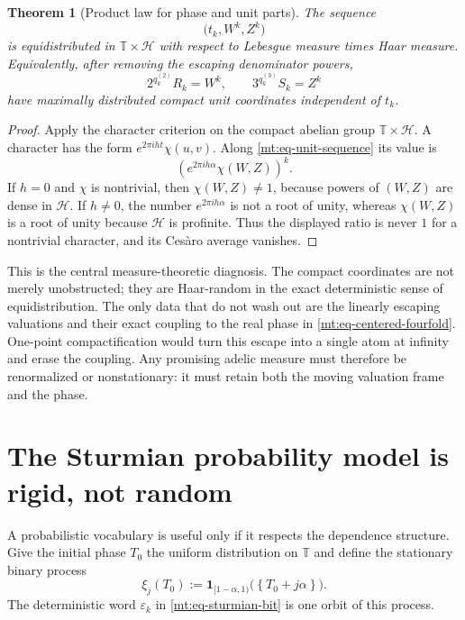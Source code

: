 \documentclass[11pt,oneside]{article}
\newtheorem{theorem}{Theorem}[section]
\theoremstyle{definition}
\theoremstyle{remark}
\newcommand{\Torus}{\mathbb T}
\newcommand{\fract}[1]{\left\{#1\right\}}
\begin{document}
\begin{theorem}[Product law for phase and unit parts]
\label{mt:thm-unit-product}
The sequence
\begin{equation}
 \bigl(t_k,W^k,Z^k\bigr)
 \label{mt:eq-unit-sequence}
\end{equation}
is equidistributed in $\Torus\times\mathcal H$ with respect to Lebesgue measure times Haar
measure.  Equivalently, after removing the escaping denominator powers,
\begin{equation}
 2^{q^{(2)}_k}R_k=W^k,
 \qquad
 3^{q^{(3)}_k}S_k=Z^k
 \label{mt:eq-unit-removal}
\end{equation}
have maximally distributed compact unit coordinates independent of $t_k$.
\end{theorem}

\begin{proof}
Apply the character criterion on the compact abelian group
$\Torus\times\mathcal H$.  A character has the form
$e^{2\pi iht}\chi(u,v)$.  Along \eqref{mt:eq-unit-sequence} its value is
\[
 \left(e^{2\pi ih\alpha}\chi(W,Z)\right)^k.
\]
If $h=0$ and $\chi$ is nontrivial, then $\chi(W,Z)\ne1$, because powers of $(W,Z)$ are dense
in $\mathcal H$.  If $h\ne0$, the number $e^{2\pi ih\alpha}$ is not a root of unity, whereas
$\chi(W,Z)$ is a root of unity because $\mathcal H$ is profinite.  Thus the displayed ratio is
never $1$ for a nontrivial character, and its Ces\`aro average vanishes.
\end{proof}

This is the central measure-theoretic diagnosis.  The compact coordinates are not merely
unobstructed; they are Haar-random in the exact deterministic sense of equidistribution.  The
only data that do not wash out are the linearly escaping valuations and their exact coupling to
the real phase in \eqref{mt:eq-centered-fourfold}.  One-point compactification would turn this
escape into a single atom at infinity and erase the coupling.  Any promising adelic measure
must therefore be renormalized or nonstationary: it must retain both the moving valuation
frame and the phase.

\section{The Sturmian probability model is rigid, not random}
\label{mt:sec-sturmian-probability}

A probabilistic vocabulary is useful only if it respects the dependence structure.  Give the
initial phase $T_0$ the uniform distribution on $\Torus$ and define the stationary binary
process
\begin{equation}
 \xi_j(T_0):=
 \mathbf1_{[1-\alpha,1)}\bigl(\fract{T_0+j\alpha}\bigr).
 \label{mt:eq-sturmian-process}
\end{equation}
The deterministic word $\varepsilon_k$ in \eqref{mt:eq-sturmian-bit} is one orbit of this
process.
\end{document}
